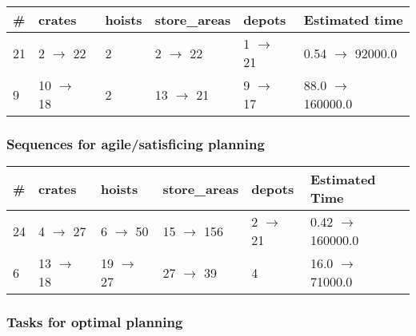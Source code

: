 \documentclass{article}
\begin{document}
                            \begin{center}
                            \begin{tabular}{@{}l|l|l|l|l|l@{}}
                            \# & crates & hoists & store\_areas & depots & Estimated time\\\midrule
                            21&2 $\rightarrow$ 22&2&2 $\rightarrow$ 22&1 $\rightarrow$ 21&0.54 $\rightarrow$ 92000.0\\
9&10 $\rightarrow$ 18&2&13 $\rightarrow$ 21&9 $\rightarrow$ 17&88.0 $\rightarrow$ 160000.0
                            \end{tabular}
                            \end{center}
                    
                         \subsubsection*{Sequences for agile/satisficing planning}

                        \begin{center}
                        \begin{tabular}{@{}l|l|l|l|l|l@{}}
                        \# & crates & hoists & store\_areas & depots & Estimated Time\\\midrule
                        24&4 $\rightarrow$ 27&6 $\rightarrow$ 50&15 $\rightarrow$ 156&2 $\rightarrow$ 21&0.42 $\rightarrow$ 160000.0\\
6&13 $\rightarrow$ 18&19 $\rightarrow$ 27&27 $\rightarrow$ 39&4&16.0 $\rightarrow$ 71000.0
                        \end{tabular}
                        \end{center}
                    
                                \subsubsection*{Tasks for optimal planning}
                                
\end{document}
